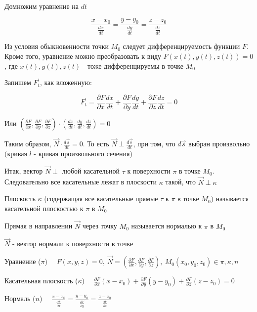 \documentclass[12pt]{article}
\begin{document}
    Домножим уравнение на $dt$

    \[\frac{x - x_0}{\frac{dx}{dt}} = \frac{y - y_0}{\frac{dy}{dt}} = \frac{z - z_0}{\frac{dz}{dt}}\]

    Из условия обыкновенности точки $M_0$ следует дифференцируемость функции $F$.
    Кроме того, уравнение можно преобразовать к виду $F(x(t), y(t), z(t)) = 0$, где $x(t), y(t), z(t)$ - тоже дифференцируемы в точке $M_0$

    Запишем $F^\prime_t$, как вложенную:

    \[F^\prime_t = \frac{\partial F}{\partial x}\frac{dx}{dt} + \frac{\partial F}{\partial y}\frac{dy}{dt} + \frac{\partial F}{\partial z}\frac{dz}{dt} = 0\]

    Или $(\frac{\partial F}{\partial x}, \frac{\partial F}{\partial y}, \frac{\partial F}{\partial z}) \cdot (\frac{dx}{dt}, \frac{dy}{dt}, \frac{dz}{dt}) = 0$

    Таким образом, $\overrightarrow{N} \cdot \frac{d\overrightarrow{s}}{dt} = 0$. То есть $\overrightarrow{N} \perp \frac{d\overrightarrow{s}}{dt}$, при том, что $d\overrightarrow{s}$ выбран произвольно (кривая $l$ - кривая произвольного сечения)

    Итак, вектор $\overrightarrow{N} \perp$ любой касательной $\tau$ к поверхности $\pi$ в точке $M_0$.
    Следовательно все касательные лежат в плоскости $\kappa$ такой, что $\overrightarrow{N} \perp \kappa$

    \Def Плоскость $\kappa$ (содержащая все касательные прямые $\tau$ к $\pi$ в точке $M_0$) называется касательной плоскостью к $\pi$ в $M_0$

    \Def Прямая в направлении $\overrightarrow{N}$ через точку $M_0$ называется нормалью к $\pi$ в $M_0$

    $\overrightarrow{N}$ - вектор нормали к поверхности в точке

    Уравнение ($\pi$) $\quad F(x, y, z) = 0, \ \overrightarrow{N} = (\frac{\partial F}{\partial x}, \frac{\partial F}{\partial y}, \frac{\partial F}{\partial z}), \ M_0(x_0, y_0, z_0) \in \pi, \kappa, n$

    Касательная плоскость ($\kappa$) $\quad \frac{\partial F}{\partial x} (x - x_0) + \frac{\partial F}{\partial y} (y - y_0) + \frac{\partial F}{\partial z} (z - z_0) = 0$

    Нормаль ($n$) $\quad \frac{x - x_0}{\frac{\partial F}{\partial x}} = \frac{y - y_0}{\frac{\partial F}{\partial y}} = \frac{z - z_0}{\frac{\partial F}{\partial z}}$
\end{document}
